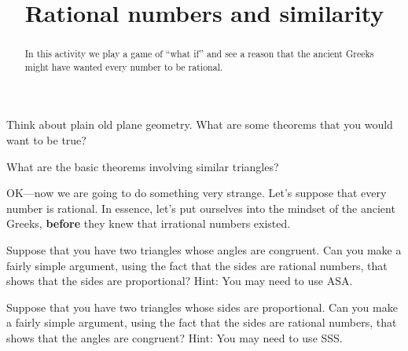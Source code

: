 \documentclass{ximera}
\title{Rational numbers and similarity}
\begin{document}
\begin{abstract}
In this activity we play a game of ``what if'' and see a reason that
  the ancient Greeks might have wanted every number to be rational.
\end{abstract}  
\maketitle

\begin{exploration}
Think about plain old plane geometry. What are some theorems that you
would want to be true?
\end{exploration}



\begin{question}
What are the basic theorems involving similar triangles?
\end{question}

OK---now we are going to do something very strange. Let's suppose that
every number is rational. In essence, let's put ourselves into the
mindset of the ancient Greeks, \textbf{before} they knew that
irrational numbers existed.

\begin{exploration}
Suppose that you have two triangles whose angles are congruent. Can
you make a fairly simple argument, using the fact that the sides are
rational numbers, that shows that the sides are proportional? Hint:
You may need to use ASA.
\end{exploration}


\begin{exploration}
Suppose that you have two triangles whose sides are proportional. Can
you make a fairly simple argument, using the fact that the sides are
rational numbers, that shows that the angles are congruent? Hint: You
may need to use SSS.
\end{exploration}
\end{document}
